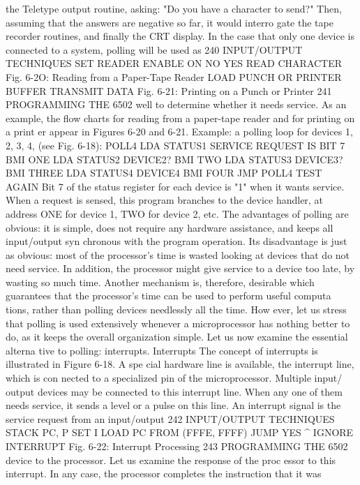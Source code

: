 \documentclass{book}
\begin{document}
the Teletype output routine, asking: "Do you have a character to send?"
Then, assuming that the answers are negative so far, it would interro
gate the tape recorder routines, and finally the CRT display. In the case
that only one device is connected to a system, polling will be used as
240
INPUT/OUTPUT TECHNIQUES
SET READER
ENABLE ON
NO
YES
READ CHARACTER
Fig. 6-2O: Reading from a Paper-Tape Reader
LOAD PUNCH
OR PRINTER
BUFFER
TRANSMIT
DATA
Fig. 6-21: Printing on a Punch or Printer
241
PROGRAMMING THE 6502
well to determine whether it needs service. As an example, the flow
charts for reading from a paper-tape reader and for printing on a print
er appear in Figures 6-20 and 6-21.
Example: a polling loop for devices 1, 2, 3, 4, (see Fig. 6-18):
POLL4 LDA STATUS1 SERVICE REQUEST IS BIT 7
BMI ONE
LDA STATUS2 DEVICE2?
BMI TWO
LDA STATUS3 DEVICE3?
BMI THREE
LDA STATUS4 DEVICE4
BMI FOUR
JMP POLL4 TEST AGAIN
Bit 7 of the status register for each device is "1" when it wants
service. When a request is sensed, this program branches to the
device handler, at address ONE for device 1, TWO for device 2, etc.
The advantages of polling are obvious: it is simple, does not
require any hardware assistance, and keeps all input/output syn
chronous with the program operation. Its disadvantage is just as
obvious: most of the processor's time is wasted looking at devices
that do not need service. In addition, the processor might give
service to a device too late, by wasting so much time.
Another mechanism is, therefore, desirable which guarantees
that the processor's time can be used to perform useful computa
tions, rather than polling devices needlessly all the time. How
ever, let us stress that polling is used extensively whenever a
microprocessor has nothing better to do, as it keeps the overall
organization simple. Let us now examine the essential alterna
tive to polling: interrupts.
Interrupts
The concept of interrupts is illustrated in Figure 6-18. A spe
cial hardware line is available, the interrupt line, which is con
nected to a specialized pin of the microprocessor. Multiple input/
output devices may be connected to this interrupt line. When any
one of them needs service, it sends a level or a pulse on this line.
An interrupt signal is the service request from an input/output
242
INPUT/OUTPUT TECHNIQUES
STACK PC, P
SET I
LOAD PC FROM
(FFFE, FFFF)
JUMP
YES ^ IGNORE
INTERRUPT
Fig. 6-22: Interrupt Processing
243
PROGRAMMING THE 6502
device to the processor. Let us examine the response of the proc
essor to this interrupt.
In any case, the processor completes the instruction that it was
\end{document}
